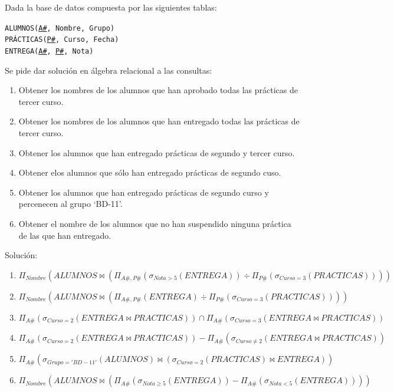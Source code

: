 \documentclass[a4paper]{article}
\begin{document}
Dada la base de datos compuesta por las siguientes tablas:

\begin{addmargin}[1.5em]{0em}
    \texttt{ALUMNOS(\underline{A\#}, Nombre, Grupo)}\\
    \texttt{PRÁCTICAS(\underline{P\#}, Curso, Fecha)}\\
    \texttt{ENTREGA(\underline{A\#}, \underline{P\#}, Nota)}
\end{addmargin}

Se pide dar solución en álgebra relacional a las consultas:

\begin{enumerate}
    \item Obtener los nombres de los alumnos que han aprobado todas las prácticas de tercer curso.
    \item Obtener los nombres de los alumnos que han entregado todas las prácticas de tercer curso.
    \item Obtener los alumnos que han entregado prácticas de segundo y tercer curso.
    \item Obtener elos alumnos que sólo han entregado prácticas de segundo cuso.
    \item Obtener los alumnos que han entregado prácticas de segundo curso y percenecen al grupo `BD-11'.
    \item Obtener el nombre de los alumnos que no han suspendido ninguna práctica de las que han entregado.
\end{enumerate}

\begin{solution}
    Solución:

    \begin{enumerate}
        \item $\Pi_{Nombre} \left( ALUMNOS \bowtie \left( \Pi_{A\#,P\#} \left( \sigma_{Nota>5} \left( ENTREGA \right) \right) \div \Pi_{P\#} \left( \sigma_{Curso=3} \left( PRACTICAS \right) \right) \right) \right)$
        \item $\Pi_{Nombre} \left( ALUMNOS \bowtie \left( \Pi_{A\#,P\#} \left( ENTREGA \right) \div \Pi_{P\#} \left( \sigma_{Curso=3} \left( PRACTICAS \right) \right)\right) \right)$
        \item $\Pi_{A\#} \left( \sigma_{Curso=2} \left( ENTREGA \bowtie PRACTICAS \right) \right) \cap \Pi_{A\#} \left( \sigma_{Curso=3} \left( ENTREGA \bowtie PRACTICAS \right) \right)$
        \item $\Pi_{A\#} \left( \sigma_{Curso=2} \left( ENTREGA \bowtie PRACTICAS \right) \right) - \Pi_{A\#} \left( \sigma_{Curso \neq 2} \left( ENTREGA \bowtie PRACTICAS \right) \right)$
        \item $\Pi_{A\#} \left( \sigma_{Grupo='BD-11'} \left( ALUMNOS \right) \bowtie \left( \sigma_{Curso=2} \left( PRACTICAS \right) \bowtie ENTREGA \right) \right)$
        \item $\Pi_{Nombre} \left( ALUMNOS \bowtie \left( \Pi_{A\#} \left( \sigma_{Nota \geq 5} \left( ENTREGA \right) \right) - \Pi_{A\#} \left( \sigma_{Nota<5} \left( ENTREGA \right) \right) \right) \right)$
    \end{enumerate}
\end{solution}
\end{document}
